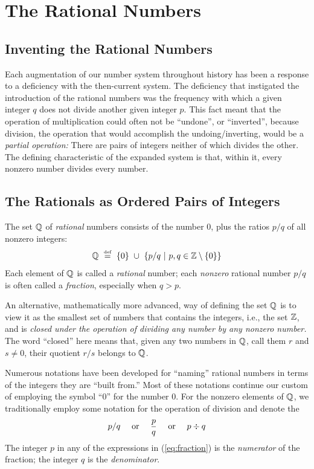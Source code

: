\section{The Rational Numbers}
\label{sec:rationals}

\subsection{Inventing the Rational Numbers}

Each augmentation of our number system throughout history has been a
response to a deficiency with the then-current system.  The deficiency
that instigated the introduction of the rational numbers was the
frequency with which a given integer $q$ does not divide another given
integer $p$.  This fact meant that the operation of multiplication
could often not be ``undone'', or ``inverted'', because division, the
operation that would accomplish the undoing/inverting, would be a {\em
  partial operation:} There are pairs of integers neither of which
divides the other.  The defining characteristic of the expanded system
is that, within it, every nonzero number divides every number.


\subsection{The Rationals as Ordered Pairs of Integers}

The set $\mathbb{Q}$ of {\it rational} numbers
consists of the number $0$, plus the ratios $p/q$ of all nonzero
integers:
\[ \Q \ \eqdef \ \{0\} \ \cup \ \left\{ p/q \ | \ p, q \in \Z
\setminus \{0\} \right\}
\]
Each element of $\mathbb{Q}$ is called a {\it rational} number;
each {\em nonzero} rational number $p/q$ is often called a {\em
  fraction},
especially when $q > p$.

An alternative, mathematically more advanced, way of defining the set
$\mathbb{Q}$ is to view it as the smallest set of numbers that contains the
integers, i.e., the set $\mathbb{Z}$, and is {\it closed under the operation
  of dividing any number by any nonzero number.}
The word ``closed'' here means that, given any two numbers in $\mathbb{Q}$,
call them $r$ and $s \neq 0$, their quotient $r/s$ belongs to $\mathbb{Q}$.

Numerous notations have been developed for ``naming'' rational numbers
in terms of the integers they are ``built from.''  Most of these
notations continue our custom of employing the symbol ``$0$'' for the
number $0$.  For the nonzero elements of $\mathbb{Q}$, we traditionally employ
some notation for the operation of division and denote the
\begin{equation}
\label{eq:fraction}
 p/q \ \ \ \mbox{ or } \ \ \ {p \over q} \ \ \ \mbox{ or } \ \ \ p
 \div q
\end{equation}
The integer $p$ in any of the expressions in (\ref{eq:fraction}) is
the {\it numerator}
of the fraction; the integer $q$ is the {\it denominator}.



